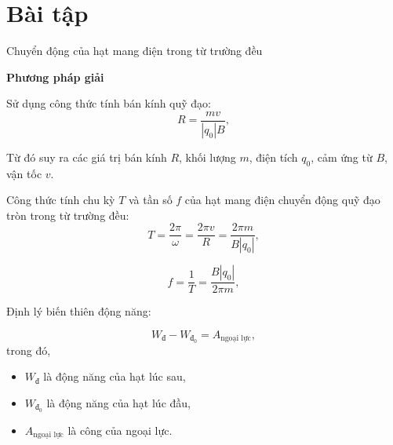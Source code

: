 \section{Bài tập }
\begin{dang}{Chuyển động của hạt mang điện trong từ trường đều}
\end{dang}
\textbf{Phương pháp giải}

Sử dụng công thức tính bán kính quỹ đạo:
\begin{equation}
R=\dfrac{mv}{\left| q_0 \right|B},
\end{equation}

Từ đó suy ra các giá trị bán kính $R$, khối lượng $m$, điện tích $q_0$, cảm ứng từ $B$, vận tốc $v$.

Công thức tính chu kỳ $T$ và tần số $f$ của hạt mang điện chuyển động quỹ đạo tròn trong từ trường đều:
\begin{equation}
T=\dfrac{2\pi}{\omega}=\dfrac{2\pi v}{R}=\dfrac{2\pi m}{B\left| q_0\right| },
\end{equation}

\begin{equation}
f=\dfrac{1}{T}=\dfrac{B\left| q_0\right| }{2\pi m},
\end{equation}

Định lý biến thiên động năng:

\begin{equation}
W_\text{đ}-W_{\text{đ}_0}=A_\text{ngoại lực},
\end{equation}
trong đó,

\begin{itemize}
	\item $W_\text{đ}$ là động năng của hạt lúc sau,
	\item $W_{\text{đ}_0}$ là động năng của hạt lúc đầu,
	\item $A_\text{ngoại lực}$ là công của ngoại lực.
\end{itemize}



